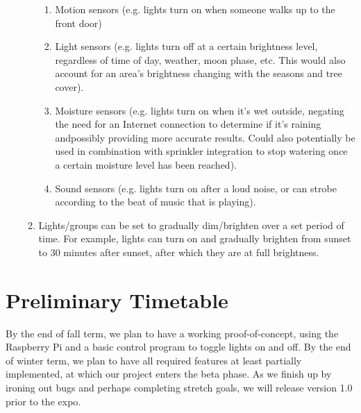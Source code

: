 \documentclass[12pt]{article}
\begin{document}
\begin{enumerate}[resume]
\begin{enumerate}
\begin{enumerate}
                    \item Motion sensors (e.g. lights turn on when someone
                        walks up to the front door)
                    \item Light sensors (e.g. lights turn off at a certain
                        brightness level, regardless of time of day, weather,
                        moon phase, etc.  This would also account for an area's
                        brightness changing with the seasons and tree cover).
                    \item Moisture sensors (e.g. lights turn on when it's wet
                        outside, negating the need for an Internet connection
                        to determine if it's raining andpossibly providing more
                        accurate results.  Could also potentially be used in
                        combination with sprinkler integration to stop watering
                        once a certain moisture level has been reached).
                    \item Sound sensors (e.g. lights turn on after a loud
                        noise, or can strobe according to the beat of music
                        that is playing).
                \end{enumerate}
            \item Lights/groups can be set to gradually dim/brighten over a set
                period of time.  For example, lights can turn on and gradually
                brighten from sunset to 30 minutes after sunset, after which
                they are at full brightness.
        \end{enumerate}
\end{enumerate}

\section{Preliminary Timetable}

By the end of fall term, we plan to have a working proof-of-concept, using the
Raspberry Pi and a basic control program to toggle lights on and off.  By the
end of winter term, we plan to have all required features at least partially
implemented, at which our project enters the beta phase.  As we finish up by
ironing out bugs and perhaps completing stretch goals, we will release version
1.0 prior to the expo.
\end{document}
